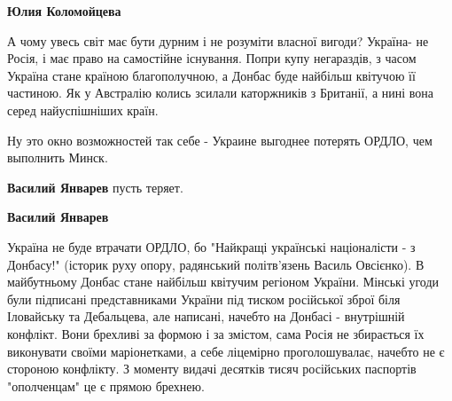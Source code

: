 \begin{itemize}
\begin{itemize}
\textbf{Юлия Коломойцева} 

А чому увесь світ має бути дурним і не розуміти власної вигоди? Україна- не
Росія, і має право на самостійне існування. Попри купу негараздів, з часом
Україна стане країною благополучною, а Донбас буде найбільш квітучою її
частиною. Як у Австралію колись зсилали каторжників з Британії, а нині вона
серед найуспішніших країн.

\end{itemize} %


Ну это окно возможностей так себе - Украине выгоднее потерять ОРДЛО, чем
выполнить Минск.

\begin{itemize} %
\textbf{Василий Январев} пусть теряет.

\textbf{Василий Январев} 

Україна не буде втрачати ОРДЛО, бо "Найкращі українські націоналісти - з
Донбасу!" (історик руху опору, радянський політв'язень Василь Овсієнко). В
майбутньому Донбас стане найбільш квітучим регіоном України. Мінські угоди були
підписані представниками України під тиском російської зброї біля Іловайську та
Дебальцева, але написані, начебто на Донбасі - внутрішній конфлікт. Вони
брехливі за формою і за змістом, сама Росія не збирається їх виконувати своїми
маріонетками, а себе ліцемірно проголошувалає, начебто не є стороною конфлікту.
З моменту видачі десятків тисяч російських паспортів "ополченцам" це є прямою
брехнею.

\end{itemize} %

\end{itemize} %
